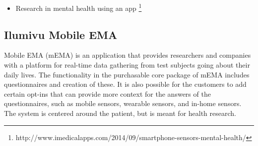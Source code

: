 \begin{itemize}
    \item Research in mental health using an app \footnote{http://www.imedicalapps.com/2014/09/smartphone-sensors-mental-health/}
\end{itemize}

\subsection{Ilumivu Mobile EMA}
\label{sub:ilumivu_mobile_ema}

Mobile EMA (mEMA) is an application that provides researchers and companies with a platform for real-time data gathering from test subjects going about their daily lives. The functionality in the purchasable core package of mEMA includes questionnaires and creation of these. It is also possible for the customers to add certain opt-ins that can provide more context for the answers of the questionnaires, such as mobile sensors, wearable sensors, and in-home sensors. The system is centered around the patient, but is meant for health research.





